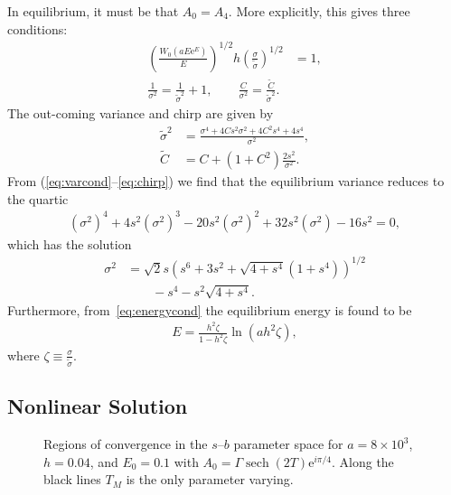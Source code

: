 \documentclass[%
 aps,
 jmp,%
 amsmath,amssymb,
 reprint,%
nofootinbib
]{revtex4-1}
\DeclareMathOperator{\sech}{sech}
\begin{document}
In equilibrium, it must be that $A_0 = A_4$.
More explicitly, this gives three conditions:
\begin{align}
\label{eq:energycond}
	\left( \frac{W_0(a E \textrm{e}^E)}{E} \right)^{1/2} h \left( \frac{\sigma}{\widetilde{\sigma}} \right)^{1/2} &= 1, \\
\label{eq:varcond}
	\frac{1}{\sigma^2} = \frac{1}{\widetilde{\sigma}^2} + 1, \qquad
	\frac{C}{\sigma^2} = \frac{\widetilde{C}}{\widetilde{\sigma}^2}.
\end{align}
The out-coming variance and chirp are given by \cite{agrawal2013}
\begin{align}
\label{eq:variance}
	\widetilde{\sigma}^2 &= \frac{\sigma^4 + 4 C s^2 \sigma^2 + 4 C^2 s^4 +4s^4}{\sigma^2}, \\
\label{eq:chirp}
	\widetilde{C} &= C + \left( 1 + C^2 \right) \frac{2s^2}{\sigma^2}.
\end{align}
From (\ref{eq:varcond}--\ref{eq:chirp}) we find that the equilibrium variance reduces to the quartic
\begin{align*}
\left( \sigma^2 \right)^4 + 4 s^2 \left( \sigma^2 \right)^3 - 20 s^2 \left( \sigma^2 \right)^2 + 32 s^2 \left( \sigma^2 \right) - 16 s^2 = 0,
\end{align*}
which has the solution
\begin{align*}
\sigma^2 &= \sqrt{2} s \left( s^6 + 3s^2 + \sqrt{4 + s^4}(1 + s^4) \right)^{1/2} \\
&\qquad - s^4 - s^2 \sqrt{4 + s^4}.
\end{align*}
Furthermore, from~\eqref{eq:energycond} the equilibrium energy is found to be
\begin{align}
	\label{eq:equilenergy}
	E = \frac{h^2 \zeta}{1 - h^2 \zeta} \ln \left( a h^2 \zeta \right),
\end{align}
where $\displaystyle \zeta \equiv \frac{\sigma}{\widetilde{\sigma}}$.

\subsection{Nonlinear Solution}

\begin{figure*}
\begin{subfigure}[]{0.5\textwidth}

\end{subfigure}%
\begin{subfigure}[]{0.5\textwidth}

\end{subfigure}
\caption{Regions of convergence in the $s$--$b$ parameter space for $a = 8 \times 10^3$, $h = 0.04$, and $E_0 = 0.1$ with $A_0 = \Gamma \sech{(2T)} \textrm{e}^{i \pi / 4}$. Along the black lines $T_M$ is the only parameter varying.}
\label{fig:DMmap}
\end{figure*}
\end{document}
